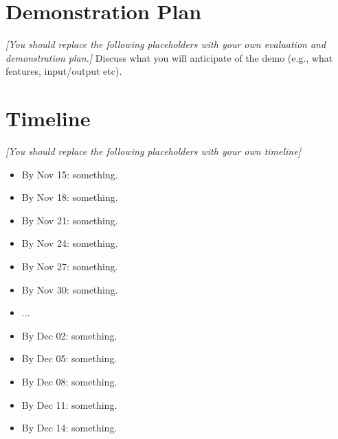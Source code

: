 \documentclass[10pt,twocolumn,letterpaper]{article}
\newcommand{\note}[1]{{\it\color{red} #1}}
\begin{document}

\section{Demonstration Plan}
\label{sec:evaluation}

\note{[You should replace the following placeholders with your own evaluation and demonstration plan.]} Discuss what you will anticipate of the demo (e.g., what features, input/output etc). 

\section{Timeline}
\label{sec:timeline}
\cite{clouse1992teaching}
\note{[You should replace the following placeholders with your own timeline]}
\begin{itemize}
    \item By Nov 15: something.
    \item By Nov 18: something.
    \item By Nov 21: something.
    \item By Nov 24: something.
    \item By Nov 27: something.
    \item By Nov 30: something.
    \item ...
    \item By Dec 02: something.
    \item By Dec 05: something.
    \item By Dec 08: something.
    \item By Dec 11: something.
    \item By Dec 14: something.
\end{itemize}


{\small


}
\end{document}
